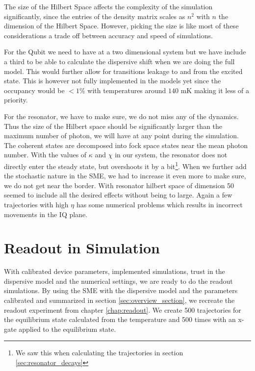 The size of the Hilbert Space affects the complexity of the simulation significantly, since the entries of the density matrix scales as $n^2$ with $n$ the dimension of the Hilbert Space. However, picking the size is like most of these considerations a trade off between accuracy and speed of simulations. 

For the Qubit we need to have at a two dimensional system but we have include a third to be able to calculate the dispersive shift when we are doing the full model. This would further allow for transitions leakage to and from the excited state. This is however not fully implemented in the models yet since the occupancy would be $<1\%$ with temperatures around $140$ mK making it less of a priority.  

For the resonator, we have to make sure, we do not miss any of the dynamics. Thus the size of the Hilbert space should be significantly larger than the maximum number of photon, we will have at any point during the simulation. The coherent states are decomposed into fock space states near the mean photon number. With the values of $\kappa$ and $\chi$ in our system, the resonator does not directly enter the steady state, but overshoots it by a bit\footnote[][1 cm]{We saw this when calculating the trajectories in section \ref{sec:resonator_decays}}. When we further add the stochastic nature in the SME, we had to increase it even more to make sure, we do not get near the border. With resonator hilbert space of dimension 50 seemed to include all the desired effects without being to large. Again a few trajectories with high $\eta$ has some numerical problems which results in incorrect movements in the IQ plane. 

\section{Readout in Simulation}\label{sec:readout_in_simulation}
With calibrated device parameters, implemented simulations, trust in the dispersive model and the numerical settings, we are ready to do the readout simulations. By using the SME with the dispersive model and the parameters calibrated and summarized in section \ref{sec:overview_section}, we recreate the readout experiment from chapter \ref{chap:readout}. We create 500 trajectories for the equilibrium state calculated from the temperature and 500 times with an x-gate applied to the equilibrium state.

